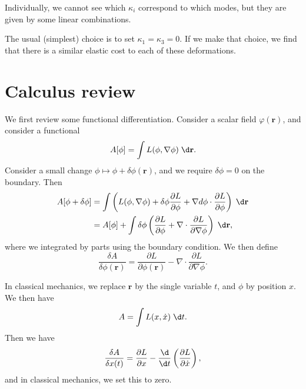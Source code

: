 \documentclass[a4paper]{article}
\begin{document}
\begin{center}
\end{center}
Individually, we cannot see which $\kappa_i$ correspond to which modes, but they are given by some linear combinations.

The usual (simplest) choice is to set $\kappa_1 = \kappa_3 = 0$. If we make that choice, we find that there is a similar elastic cost to each of these deformations.

\section{Calculus review}
We first review some functional differentiation. Consider a scalar field $\varphi(\mathbf{r})$, and consider a functional
\[
  A[\phi] = \int L(\phi, \nabla \phi)\;\d \mathbf{r}.
\]
Consider a small change $\phi \mapsto \phi + \delta \phi(\mathbf{r})$, and we require $\delta \phi = 0$ on the boundary. Then
\begin{align*}
  A[\phi + \delta \phi] &= \int \left(L(\phi, \nabla \phi) + \delta \phi \frac{\partial L}{\partial \phi} + \nabla d \phi \cdot \frac{\partial L}{\partial \phi}\right)\;\d \mathbf{r}\\
  &= A[\phi] + \int \delta \phi \left(\frac{\partial L}{\partial \phi} + \nabla \cdot \frac{\partial L}{\partial \nabla \phi}\right)\;\d \mathbf{r},
\end{align*}
where we integrated by parts using the boundary condition. We then define
\[
  \frac{\delta A}{\delta \phi(\mathbf{r})} = \frac{\partial L}{\partial \phi(\mathbf{r})} - \nabla \cdot \frac{\partial L}{\partial \nabla \phi}.
\]
\begin{eg}
  In classical mechanics, we replace $\mathbf{r}$ by the single variable $t$, and $\phi$ by position $x$. We then have
  \[
    A = \int L(x, \dot{x})\;\d t.
  \]
  Then we have
  \[
    \frac{\delta A}{\delta x(t)} = \frac{\partial L}{\partial x} - \frac{\d}{\d t} \left(\frac{\partial L}{\partial \dot{x}}\right),
  \]
  and in classical mechanics, we set this to zero.
\end{eg}
\end{document}
